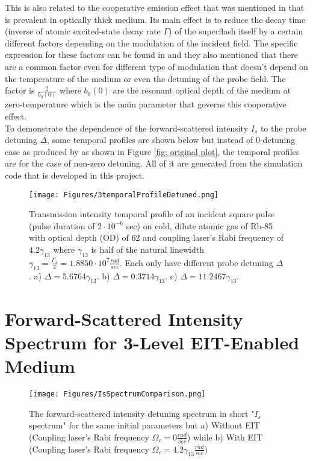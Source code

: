 This is also related to the cooperative emission effect that was mentioned in \cite{Kwong2014, Kwong2015, Kwong2017, Araujo2016} that is prevalent in optically thick medium. Its main effect is to reduce the decay time (inverse of atomic excited-state decay rate $\Gamma$) of the superflash itself by a certain different factors depending on the modulation of the incident field. The specific expression for these factors can be found in \cite{Kwong2017} and they also mentioned that there are a common factor even for different type of modulation that doesn't depend on the temperature of the medium or even the detuning of the probe field. The factor is $\frac{2}{b_{0}(0)}$ where $b_{0}(0)$ are the resonant optical depth of the medium at zero-temperature which is the main parameter that governs this cooperative effect.\\

To demonstrate the dependence of the forward-scattered intensity $I_{s}$ to the probe detuning $\Delta$, some temporal profiles are shown below but instead of 0-detuning case as produced by \cite{jeong2010slow} as shown in Figure \ref{fig: original plot}, the temporal profiles are for the case of non-zero detuning. All of it are generated from the simulation code that is developed in this project.

\begin{figure}[h!]
    \centering
    \texttt{[image: Figures/3temporalProfileDetuned.png]}
    \caption{Transmission intensity temporal profile of an incident square pulse (pulse duration of $2\cdot10^{-6}$ sec) on cold, dilute atomic gas of Rb-85 with optical depth (OD) of 62 and coupling laser's Rabi frequency of $4.2\gamma_{13}$ where $\gamma_{13}$ is half of the natural linewidth $\gamma_{13} = \frac{\Gamma_{3}}{2} = 1.8850 \cdot 10^{7} \frac{rad}{sec}$. Each only have different probe detuning $\Delta$. a) $\Delta = 5.6764\gamma_{13}$. b) $\Delta = 0.3714\gamma_{13}$. c) $\Delta = 11.2467\gamma_{13}$.}
    \label{fig: comparing temporal profile}
\end{figure}


\section{Forward-Scattered Intensity Spectrum for 3-Level EIT-Enabled Medium}

\begin{figure}[h!]
    \centering
    \texttt{[image: Figures/IsSpectrumComparison.png]}
    \caption{The forward-scattered intensity detuning spectrum in short "$I_{s}$ spectrum" for the same initial parameters but a) Without EIT (Coupling laser's Rabi frequency $\Omega_{c} = 0 \frac{rad}{sec}$) while b) With EIT (Coupling laser's Rabi frequency $\Omega_{c} = 4.2\gamma_{13} \frac{rad}{sec}$)}
    \label{fig: comparing Is sepctrum}
\end{figure}


